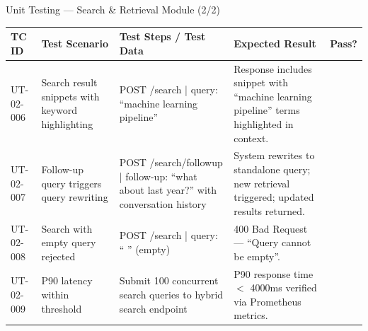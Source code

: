\documentclass[aspectratio=169,xcolor=dvipsnames]{beamer}
\newcommand{\cmark}{\checkmark}
\newcommand{\tw}{\textwidth}
\begin{document}
\begin{frame}{Unit Testing — Search \& Retrieval Module (2/2)}
  \tiny\renewcommand{\arraystretch}{0.88}
  \begin{table}
    \centering
    \setlength{\tabcolsep}{2pt}
    \begin{tabular}{p{.09\tw}|p{.15\tw}|p{.44\tw}|p{.18\tw}|p{.07\tw}}
      \toprule
      \textbf{TC ID} & \textbf{Test Scenario} & \textbf{Test Steps / Test Data} & \textbf{Expected Result} & \textbf{Pass?}\\
      \midrule
      UT-02-006 & Search result snippets with keyword highlighting &
        POST /search | query: ``machine learning pipeline'' &
        Response includes snippet with ``machine learning pipeline'' terms highlighted in context. & \textcolor{green!60!black}{\cmark}\\
      \midrule
      UT-02-007 & Follow-up query triggers query rewriting &
        POST /search/followup | follow-up: ``what about last year?'' with conversation history &
        System rewrites to standalone query; new retrieval triggered; updated results returned. & \textcolor{green!60!black}{\cmark}\\
      \midrule
      UT-02-008 & Search with empty query rejected &
        POST /search | query: `` '' (empty) &
        400 Bad Request — ``Query cannot be empty''. & \textcolor{green!60!black}{\cmark}\\
      \midrule
      UT-02-009 & P90 latency within threshold &
        Submit 100 concurrent search queries to hybrid search endpoint &
        P90 response time $<$ 4000ms verified via Prometheus metrics. & \textcolor{green!60!black}{\cmark}\\
      \bottomrule
    \end{tabular}
  \end{table}
\end{frame}
\end{document}
